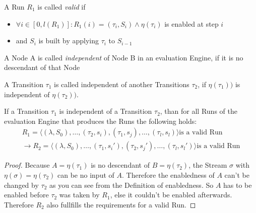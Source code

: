 \begin{definition}[name = Valid Run]\label{def:valid_run}
  A Run \(R_1\) is called \emph{valid} if
  \begin{itemize}
    \item \(\forall i \in [0,l(R_1)]: R_1(i) = (\tau_i,S_i) \land \eta(\tau_i)\) is enabled at step \(i\)
    \item and \(S_i\) is built by applying \(\tau_i\) to \(S_{i-1}\)
  \end{itemize}
\end{definition}

\begin{definition}[name = Independence of Nodes]\label{def:node_independent}
  A Node A is called \emph{independent} of Node B in an evaluation Engine, if it is no descendant of that Node
\end{definition}

\begin{definition}[name = Independence of Transitions]\label{def:independence_transitions}
  A Transition \(\tau_1\) is called independent of another Transitions \(\tau_2\), if \(\eta(\tau_1))\) is independent of \(\eta(\tau_2))\).
\end{definition}

\begin{lemma}[name = Exchange of independent Transitions]
  If a Transition \(\tau_1\) is independent of a Transition \(\tau_2\), than for all Runs of the evaluation Engine that produces the Runs the following holds:
  \begin{align*}
    R_1 = \langle (\lambda, S_0), \dots, (\tau_2, s_i), (\tau_1, s_j), \dots, (\tau_l, s_l) \rangle \text{is a valid Run} \\
    \rightarrow R_2 = \langle (\lambda, S_0), \dots, (\tau_1, s_i'), (\tau_2, s_j'), \dots, (\tau_l, s_l') \rangle \text{is a valid Run}
  \end{align*}
\end{lemma}

\begin{proof}
  Because \(A = \eta(\tau_1)\) is no descendant of \(B = \eta(\tau_2)\), the Stream \(\sigma\) with \(\eta(\sigma) = \eta(\tau_2)\) can be no input of \(A\).
  Therefore the enabledness of \(A\) can't be changed by \(\tau_2\) as you can see from the Definition of enabledness.
  So \(A\) has to be enabled before \(\tau_2\) was taken by \(R_1\), else it couldn't be enabled afterwards.
  Therefore \(R_2\) also fullfills the requirements for a valid Run.
\end{proof}

